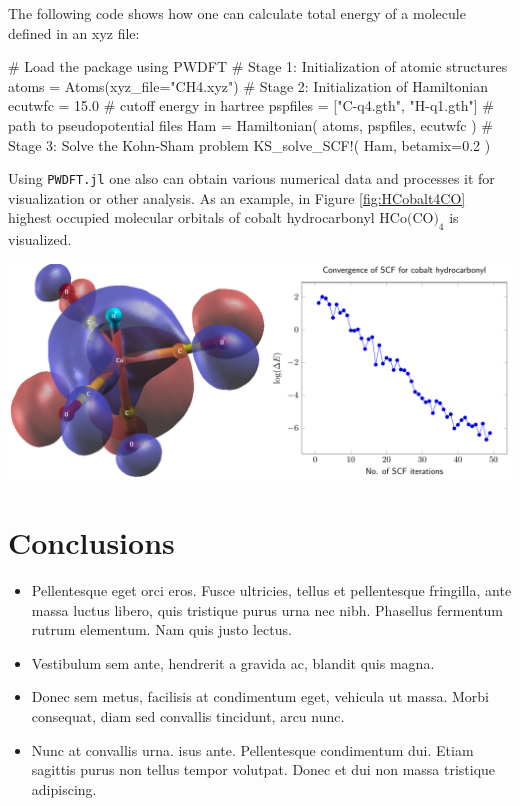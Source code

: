 \documentclass[a0,landscape]{a0poster}
\begin{document}
\begin{multicols}{3}
The following code shows how one can calculate total energy of a molecule
defined in an xyz file:

\begin{juliacode}
# Load the package
using PWDFT
# Stage 1: Initialization of atomic structures
atoms = Atoms(xyz_file="CH4.xyz")
# Stage 2: Initialization of Hamiltonian
ecutwfc = 15.0  # cutoff energy in hartree
pspfiles = ["C-q4.gth", "H-q1.gth"] # path to pseudopotential files
Ham = Hamiltonian( atoms, pspfiles, ecutwfc )
# Stage 3: Solve the Kohn-Sham problem
KS_solve_SCF!( Ham, betamix=0.2 )
\end{juliacode}

Using \texttt{PWDFT.jl} one also can obtain various numerical data
and processes it for visualization or other analysis. As an example,
in Figure \ref{fig:HCobalt4CO} highest occupied molecular orbitals
of cobalt hydrocarbonyl $\textrm{HCo(CO)}_{4}$ is visualized.

\begin{center}
\includegraphics[scale=1.0]{figure02.pdf}
\label{fig:HCobalt4CO}
\end{center}



\color{SaddleBrown} %

\section*{Conclusions}

\begin{itemize}
\item Pellentesque eget orci eros. Fusce ultricies, tellus et pellentesque fringilla, ante massa luctus libero, quis tristique purus urna nec nibh. Phasellus fermentum rutrum elementum. Nam quis justo lectus.
\item Vestibulum sem ante, hendrerit a gravida ac, blandit quis magna.
\item Donec sem metus, facilisis at condimentum eget, vehicula ut massa. Morbi consequat, diam sed convallis tincidunt, arcu nunc.
\item Nunc at convallis urna. isus ante. Pellentesque condimentum dui. Etiam sagittis purus non tellus tempor volutpat. Donec et dui non massa tristique adipiscing.
\end{itemize}


\end{multicols}
\end{document}
